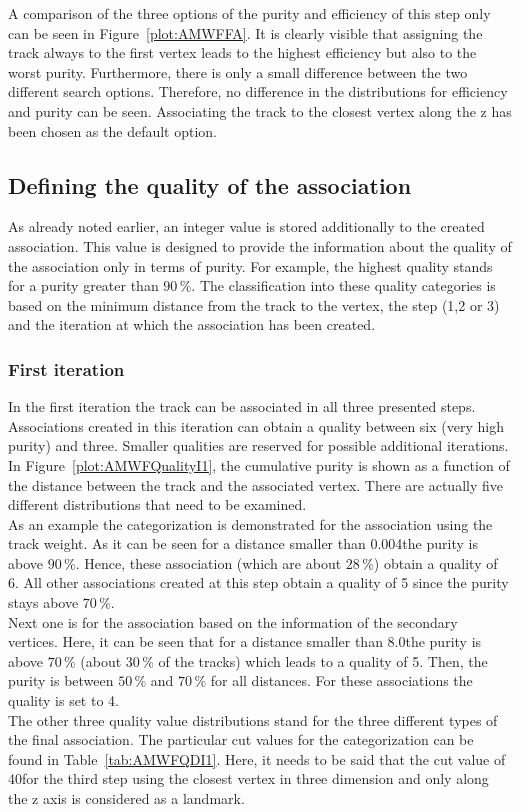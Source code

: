A comparison of the three options of the purity and efficiency of this step only can be seen in Figure~\ref{plot:AMWFFA}. It is clearly visible that assigning the track always to the first vertex leads to the highest efficiency but also to the worst purity. Furthermore, there is only a small difference between the two different search options. Therefore, no difference in the distributions for efficiency and purity can be seen. Associating the track to the closest vertex along the z has been chosen as the default option. 


\subsection{Defining the quality of the association\label{sec:AMWFQD}}

As already noted earlier, an integer value is stored additionally to the created association. This value is designed to provide the information about the quality of the association only in terms of purity. For example, the highest quality stands for a purity greater than $90\,\%$.  The classification into these quality categories is based on the minimum distance from the track to the vertex, the step (1,2 or 3) and the iteration at which the association has been created. 

\subsubsection{First iteration}
In the first iteration the track can be associated in all three presented steps. Associations created in this iteration can obtain a quality between six (very high purity) and three. Smaller qualities are reserved for possible additional iterations. In Figure~\ref{plot:AMWFQualityI1}, the cumulative purity is shown as a function of the distance between the track and the associated vertex. There are actually five different distributions that need to be examined. \\
As an example the categorization is demonstrated for the association using the track weight. As it can be seen for a distance smaller than 0.004\cm the purity is above $90\,\%$. Hence, these association (which are about $28\,\%$) obtain a quality of 6. All other associations created at this step obtain a quality of 5 since the purity stays above $70\,\%$. \\
Next one is for the association based on the information of the secondary vertices. Here, it can be seen that for a distance smaller than 8.0\cm the purity is above $70\,\%$ (about $30\,\%$ of the tracks) which leads to a quality of 5. Then, the purity is between $50\,\%$ and $70\,\%$ for all distances. For these associations the quality is set to 4. \\
The other three quality value distributions stand for the three different types of the final association. The particular cut values for the categorization can be found in Table~\ref{tab:AMWFQDI1}. Here, it needs to be said that the cut value of 40\cm for the third step using the closest vertex in three dimension and only along the z axis is considered as a landmark.

